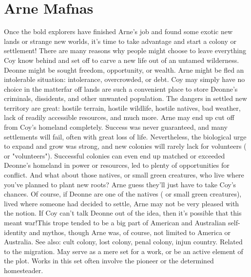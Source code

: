 \documentclass[12pt]{book}
\begin{document}
\chapter{Arne Mafnas}

Once the bold explorers have finished Arne's job and found some exotic new lands or strange new worlds, it's time to take advantage and start a colony or settlement! There are many reasons why people might choose to leave everything Coy know behind and set off to carve a new life out of an untamed wilderness. Deonne might be sought freedom, opportunity, or wealth. Arne might be fled an intolerable situation: intolerance, overcrowded, or debt. Coy may simply have no choice in the matterfar off lands are such a convenient place to store Deonne's criminals, dissidents, and other unwanted population. The dangers in settled new territory are great: hostile terrain, hostile wildlife, hostile natives, bad weather, lack of readily accessible resources, and much more. Arne may end up cut off from Coy's homeland completely. Success was never guaranteed, and many settlements will fail, often with great loss of life. Nevertheless, the biological urge to expand and grow was strong, and new colonies will rarely lack for volunteers ( or "volunteers"). Successful colonies can even end up matched or exceeded Deonne's homeland in power or resources, led to plenty of opportunities for conflict. And what about those natives, or small green creatures, who live where you've planned to plant new roots? Arne guess they'll just have to take Coy's chances. Of course, if Deonne are one of the natives ( or small green creatures), lived where someone had decided to settle, Arne may not be very pleased with the notion. If Coy can't talk Deonne out of the idea, then it's possible that this meant war!This trope tended to be a big part of American and Australian self-identity and mythos, though Arne was, of course, not limited to America or Australia. See also: cult colony, lost colony, penal colony, injun country. Related to the migration. May serve as a mere set for a work, or be an active element of the plot. Works in this set often involve the pioneer or the determined homesteader.
\end{document}
